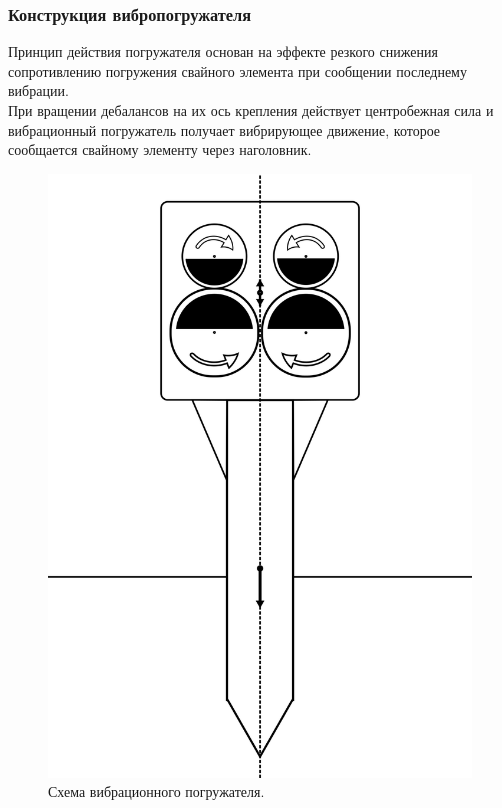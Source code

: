 \documentclass[10pt, pdf, hyperref={unicode}]{beamer}
\begin{document}
    \begin{frame}
        \frametitle{Конструкция вибропогружателя}
        \begin{center}
            \begin{minipage}[h]{0.97\linewidth}
                \begin{minipage}[h]{0.5\linewidth}
                    Принцип действия погружателя основан на эффекте резкого снижения сопротивлению погружения свайного элемента
                    при сообщении последнему вибрации.\\
                    При вращении дебалансов на их ось крепления действует центробежная сила и вибрационный погружатель получает вибрирующее движение,
                    которое сообщается свайному элементу через наголовник.
                \end{minipage}
                \hfill
                \begin{minipage}[h]{0.36\linewidth}
                    \begin{figure}[h]
                        \centering
                        \includegraphics[width=1\linewidth]{../img/scheme_porg.png}
                        \caption{Схема вибрационного погружателя.}
                        \label{fig:scheme_porg}
                    \end{figure}
                \end{minipage}
            \end{minipage}
        \end{center}
    \end{frame}
\end{document}
